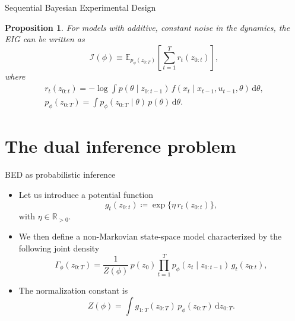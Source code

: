 \documentclass[10pt, aspectratio=1610]{beamer}
\newcommand{\dd}{\mathrm{d}}
\newtheorem{proposition}[theorem]{Proposition}
\begin{document}
    \begin{frame}{Sequential Bayesian Experimental Design}
      \begin{proposition}
        For models with additive, constant noise in the dynamics, the EIG can be written as
        \begin{equation}\label{eq:eig_constant_noise}
            \mathcal{I}(\phi) \equiv \mathbb{E}_{p_{\phi}(z_{0:T})} \left[ \sum_{t=1}^T r_{t}(z_{0:t}) \right],
        \end{equation}
        where
        \begin{gather}
          r_{t}(z_{0:t}) = - \log \int p(\theta \mid z_{0:t-1}) \, f(x_t \mid x_{t-1}, u_{t-1}, \theta) \, \dd \theta, \\
          p_\phi(z_{0:T}) = \int p_\phi(z_{0:T} \mid \theta) \, p(\theta) \, \dd \theta.
        \end{gather}
      \end{proposition}
    \end{frame}

  \section{The dual inference problem}

    \begin{frame}{BED as probabilistic inference}
      \begin{itemize}[<+->]
        \item Let us introduce a potential function
          \begin{equation}\label{eq:potential-function}
            g_{t}(z_{0:t}) \coloneq \exp \Big\{ \eta \, r_{t}(z_{0:t}) \Big\},
          \end{equation}
          with $\eta \in \mathbb{R}_{>0}$.
        \item We then define a non-Markovian state-space model characterized by the following joint density
          \begin{equation}\label{eq:pathwise_smoothing_trajectory}
            \Gamma_\phi(z_{0:T}) = \frac{1}{Z(\phi)} \, p(z_0) \prod_{t=1}^T p_\phi(z_t \mid z_{0:t-1}) \, g_t(z_{0:t}),
          \end{equation}
        \item The normalization constant is
          \begin{equation}
            Z(\phi) = \int g_{1:T}(z_{0:T}) \, p_\phi(z_{0:T}) \, \dd z_{0:T}.
          \end{equation}
      \end{itemize}
    \end{frame}
\end{document}
